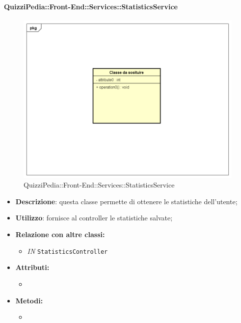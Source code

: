 \paragraph{QuizziPedia::Front-End::Services::StatisticsService}
\begin{figure}
	\centering
	\includegraphics[scale=0.45]{UML/Classi/Front-End/Temporanea.png}
	\caption{QuizziPedia::Front-End::Services::StatisticsService}
\end{figure}
\begin{itemize}
	\item \textbf{Descrizione}: questa classe permette di ottenere le statistiche dell'utente;
	\item \textbf{Utilizzo}: fornisce al controller le statistiche salvate;
	\item \textbf{Relazione con altre classi:}
	\begin{itemize}
		\item \textit{IN} \texttt{StatisticsController} 
	\end{itemize}
	\item \textbf{Attributi:}
	\begin{itemize}
		\item 
	\end{itemize}
	\item \textbf{Metodi:}
	\begin{itemize}
		\item 
	\end{itemize}
\end{itemize}

